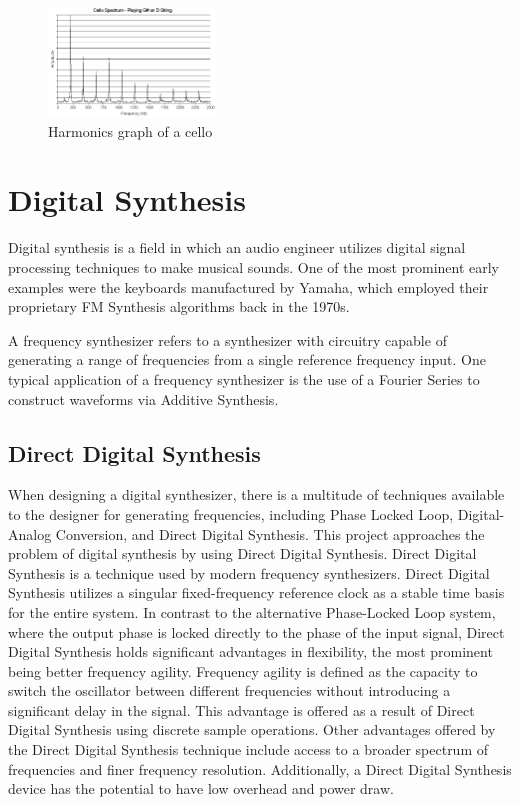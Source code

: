 \documentclass[a4paper,12pt]{report}
\begin{document}
\begin{figure}
    \centering
    \includegraphics[width=12em]{CelloHarmonicsGraph.png}
    \caption{Harmonics graph of a cello}
    \label{fig:CelloHarmonicsGraph}
\end{figure}

\section{Digital Synthesis}
\label{subsec:digitalsynth}
Digital synthesis is a field in which an audio engineer utilizes digital signal processing techniques to make musical sounds. One of the most prominent early examples were the keyboards manufactured by Yamaha, which employed their proprietary FM Synthesis algorithms back in the 1970s.

A frequency synthesizer refers to a synthesizer with circuitry capable of generating a range of frequencies from a single reference frequency input. One typical application of a frequency synthesizer is the use of a Fourier Series to construct waveforms via Additive Synthesis.

\subsection{Direct Digital Synthesis}
\label{subsec:directdigitalsynth}
When designing a digital synthesizer, there is a multitude of techniques available to the designer for generating frequencies, including Phase Locked Loop, Digital-Analog Conversion, and Direct Digital Synthesis. This project approaches the problem of digital synthesis by using Direct Digital Synthesis. Direct Digital Synthesis is a technique used by modern frequency synthesizers. Direct Digital Synthesis utilizes a singular fixed-frequency reference clock as a stable time basis for the entire system. In contrast to the alternative Phase-Locked Loop system, where the output phase is locked directly to the phase of the input signal, Direct Digital Synthesis holds significant advantages in flexibility, the most prominent being better frequency agility. Frequency agility is defined as the capacity to switch the oscillator between different frequencies without introducing a significant delay in the signal. This advantage is offered as a result of Direct Digital Synthesis using discrete sample operations. Other advantages offered by the Direct Digital Synthesis technique include access to a broader spectrum of frequencies and finer frequency resolution. Additionally, a Direct Digital Synthesis device has the potential to have low overhead and power draw.
\end{document}
